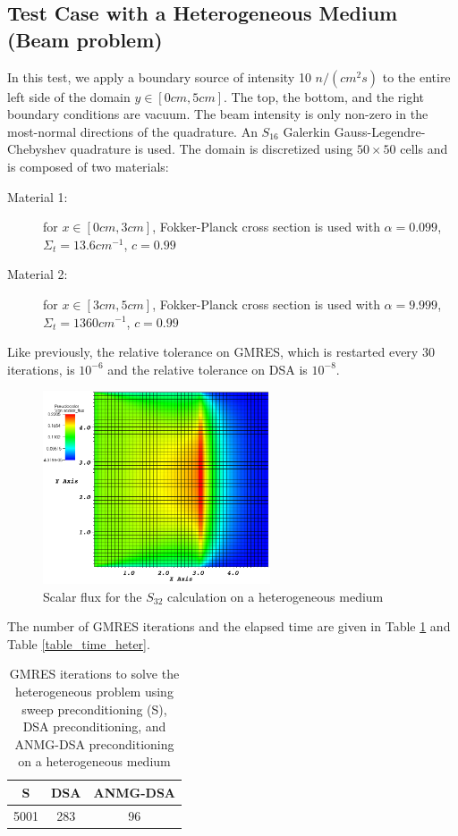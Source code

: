 \subsection{Test Case with a Heterogeneous Medium (Beam problem)}
In this test, we apply a boundary source of intensity 10 $n/(cm^2 s)$ to the
entire left side of the domain $y \in [0cm,5cm]$. The top, the bottom, 
and the right boundary conditions are vacuum. The beam intensity is only 
non-zero in the most-normal directions of the quadrature. An $S_{16}$ Galerkin 
Gauss-Legendre-Chebyshev quadrature is used. The domain
is discretized using $50 \times 50$ cells and is composed of two materials:
\begin{description}
  \item[Material 1:] for $x\in [0cm,3cm]$, Fokker-Planck cross section is used with 
    $\alpha=0.099$, $\Sigma_t = 13.6 cm^{-1}$, $c=0.99$
  \item[Material 2:] for $x\in [3cm,5cm]$, Fokker-Planck cross section is used with 
    $\alpha=9.999$, $\Sigma_t = 1360 cm^{-1}$, $c=0.99$
\end{description}
Like previously, the relative tolerance on GMRES, which is restarted every 30
iterations, is $10^{-6}$ and the relative tolerance on DSA is $10^{-8}$. 
\begin{figure}[H]
  \centering
  \includegraphics[width=0.6\textwidth]{Anmg/heterog_anmg_crop}
  \caption{Scalar flux for the $S_{32}$ calculation on a heterogeneous medium}
\end{figure}
The number of GMRES iterations and the elapsed 
time are given in Table \ref{table_gmres_heter} and Table \ref{table_time_heter}.
\begin{table}[H]
  \begin{center}
    \caption{GMRES iterations to solve the heterogeneous problem using sweep
    preconditioning (S), DSA preconditioning, and ANMG-DSA preconditioning on
    a heterogeneous medium}
    \begin{tabular}{|c|c|c|}
      \hline
      S & DSA & ANMG-DSA \\
      \hline
      5001 & 283 & 96 \\
      \hline
    \end{tabular}
    \label{table_gmres_heter}
  \end{center}
\end{table}
